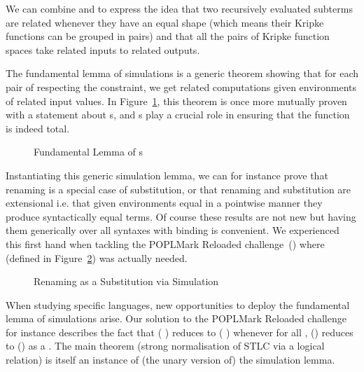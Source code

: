 \begin{agdasnippet}
\addtolength{\leftskip}{\parindent}
\end{agdasnippet}

We can combine  and  to express the idea that two recursively
evaluated subterms are related whenever they have an equal shape (which means their
Kripke functions can be grouped in pairs) and that all the pairs of Kripke function
spaces take related inputs to related outputs.

\begin{agdasnippet}
\addtolength{\leftskip}{\parindent}
\end{agdasnippet}

The fundamental lemma of simulations is a generic theorem showing that for
each pair of \semrec{} respecting the  constraint, we
get related computations given environments of related input values.
In Figure~\ref{defn:Simulation}, this theorem is once more mutually
proven with a statement about s,
and s play a crucial role in ensuring that the function is indeed total.

\begin{figure}[h]
\caption{Fundamental Lemma of s\label{defn:Simulation}}
\end{figure}

Instantiating this generic simulation lemma, we can for instance prove
that renaming is a special case of substitution, or that renaming and
substitution are extensional i.e. that given environments equal in
a pointwise manner they produce syntactically equal terms. Of course these
results are not new but having them generically over all syntaxes with
binding is convenient. We experienced this first hand when tackling the
POPLMark Reloaded challenge~(\citeyear{poplmarkreloaded}) where
 (defined in Figure~\ref{defn:RenSub}) was actually needed.

\begin{figure}[h]
\caption{Renaming as a Substitution via Simulation\label{defn:RenSub}}
\end{figure}

When studying specific languages, new opportunities to deploy the
fundamental lemma of simulations arise. Our solution to the POPLMark
Reloaded challenge for instance describes the fact that
{( \AB{$\rho$} )}
reduces to {(  )} whenever for all ,
\AB{$\rho$}() reduces to () as a .
The main theorem (strong normalisation of STLC via a logical relation)
is itself an instance of (the unary version of) the simulation lemma.

